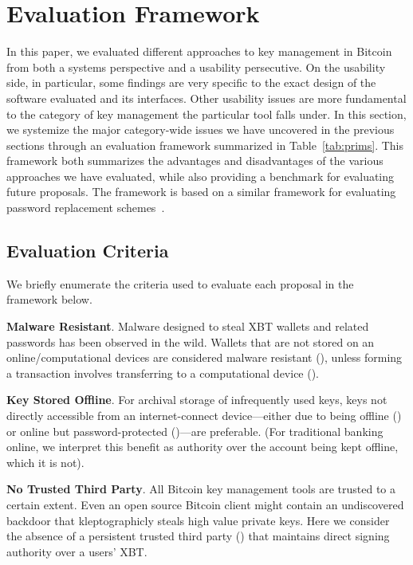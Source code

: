 \section{Evaluation Framework}
In this paper, we evaluated different approaches to key management in Bitcoin from both a systems perspective and a usability persecutive. On the usability side, in particular, some findings are very specific to the exact design of the software evaluated and its interfaces. Other usability issues are more fundamental to the category of key management the particular tool falls under. In this section, we systemize the major category-wide issues we have uncovered in the previous sections through an evaluation framework summarized in Table~\ref{tab:prims}. This framework both summarizes the advantages and disadvantages of the various approaches we have evaluated, while also providing a benchmark for evaluating future proposals. The framework is based on a similar framework for evaluating password replacement schemes~\cite{BHOS12}.

\subsection{Evaluation Criteria}
We briefly enumerate the criteria used to evaluate each proposal in the framework below. 

\textbf{Malware Resistant}.
\label{Malware Resistant}
Malware designed to steal XBT wallets and related passwords has been observed in the wild. Wallets that are not stored on an online/computational devices are considered malware resistant (\full), unless forming a transaction involves transferring to a computational device (\prt). 

\textbf{Key Stored Offline}.
\label{Key Kept Offline}
For archival storage of infrequently used keys, keys not directly accessible from an internet-connect device---either due to being offline (\full) or online but password-protected (\prt)---are preferable. (For traditional banking online, we interpret this benefit as authority over the account being kept offline, which it is not).

\textbf{No Trusted Third Party}.
\label{No Trusted Third Party}
All Bitcoin key management tools are trusted to a certain extent. Even an open source Bitcoin client might contain an undiscovered backdoor that kleptographicly steals high value private keys. Here we consider the absence of a persistent trusted third party (\full) that maintains direct signing authority over a users' XBT. 

